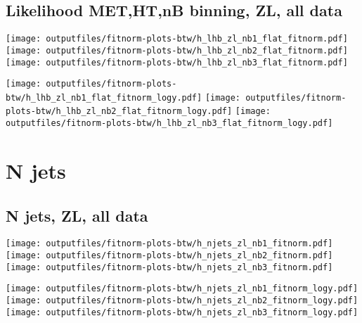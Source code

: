 \documentclass[11pt]{article}
\begin{document}
   \clearpage

    \subsection{ Likelihood MET,HT,nB binning, ZL, all data}

    \noindent
     \texttt{[image: outputfiles/fitnorm-plots-btw/h\_lhb\_zl\_nb1\_flat\_fitnorm.pdf]}
     \texttt{[image: outputfiles/fitnorm-plots-btw/h\_lhb\_zl\_nb2\_flat\_fitnorm.pdf]}
     \texttt{[image: outputfiles/fitnorm-plots-btw/h\_lhb\_zl\_nb3\_flat\_fitnorm.pdf]}

    \noindent
     \texttt{[image: outputfiles/fitnorm-plots-btw/h\_lhb\_zl\_nb1\_flat\_fitnorm\_logy.pdf]}
     \texttt{[image: outputfiles/fitnorm-plots-btw/h\_lhb\_zl\_nb2\_flat\_fitnorm\_logy.pdf]}
     \texttt{[image: outputfiles/fitnorm-plots-btw/h\_lhb\_zl\_nb3\_flat\_fitnorm\_logy.pdf]}

   \clearpage







  \clearpage
   \section{ N jets }

    \subsection{ N jets, ZL, all data}

    \noindent
     \texttt{[image: outputfiles/fitnorm-plots-btw/h\_njets\_zl\_nb1\_fitnorm.pdf]}
     \texttt{[image: outputfiles/fitnorm-plots-btw/h\_njets\_zl\_nb2\_fitnorm.pdf]}
     \texttt{[image: outputfiles/fitnorm-plots-btw/h\_njets\_zl\_nb3\_fitnorm.pdf]}

    \noindent
     \texttt{[image: outputfiles/fitnorm-plots-btw/h\_njets\_zl\_nb1\_fitnorm\_logy.pdf]}
     \texttt{[image: outputfiles/fitnorm-plots-btw/h\_njets\_zl\_nb2\_fitnorm\_logy.pdf]}
     \texttt{[image: outputfiles/fitnorm-plots-btw/h\_njets\_zl\_nb3\_fitnorm\_logy.pdf]}

   \clearpage
\end{document}
